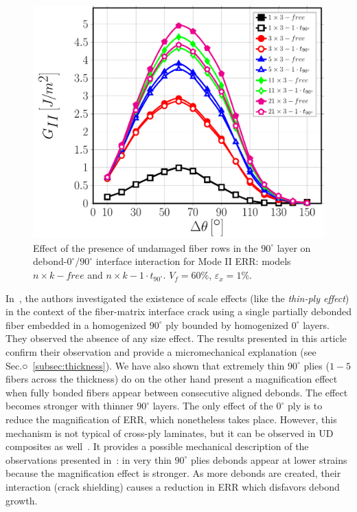 \documentclass[review]{elsarticle}
\begin{document}
\begin{figure}[!h]
\centering
\includegraphics[width=\textwidth]{nxk-1-vf60-GII.pdf}
\caption{Effect of the presence of undamaged fiber rows in the $90^{\circ}$ layer on debond-$0^{\circ}/90^{\circ}$ interface interaction for Mode II ERR: models $n\times k-free$ and $n\times k-1\cdot t_{90^{\circ}}$. $V_{f}=60\%$, $\varepsilon_{x}=1\%$.}\label{fig:nkGII}
\end{figure}

In~\cite{Velasco2018, Paris2018}, the authors investigated the existence of scale effects (like the \emph{thin-ply effect}) in the context of the fiber-matrix interface crack using a single partially debonded fiber embedded in a homogenized $90^{\circ}$ ply bounded by homogenized $0^{\circ}$ layers. They observed the absence of any size effect. The results presented in this article confirm their observation and provide a micromechanical explanation (see Sec.○~\ref{subsec:thickness}). We have also shown that extremely thin $90^{\circ}$ plies ($1-5$ fibers across the thickness) do on the other hand present a magnification effect when fully bonded fibers appear between consecutive aligned debonds. The effect becomes stronger with thinner $90^{\circ}$ layers. The only effect of the $0^{\circ}$ ply is to reduce the magnification of ERR, which nonetheless takes place. However, this mechanism is not typical of cross-ply laminates, but it can be observed in UD composites as well~\cite{DiStasio2019}. It provides a possible mechanical description of the observations presented in~\cite{Saito2012}: in very thin $90^{\circ}$ plies debonds appear at lower strains because the magnification effect is stronger. As more debonds are created, their interaction (crack shielding) causes a reduction in ERR which disfavors debond growth.
\end{document}
